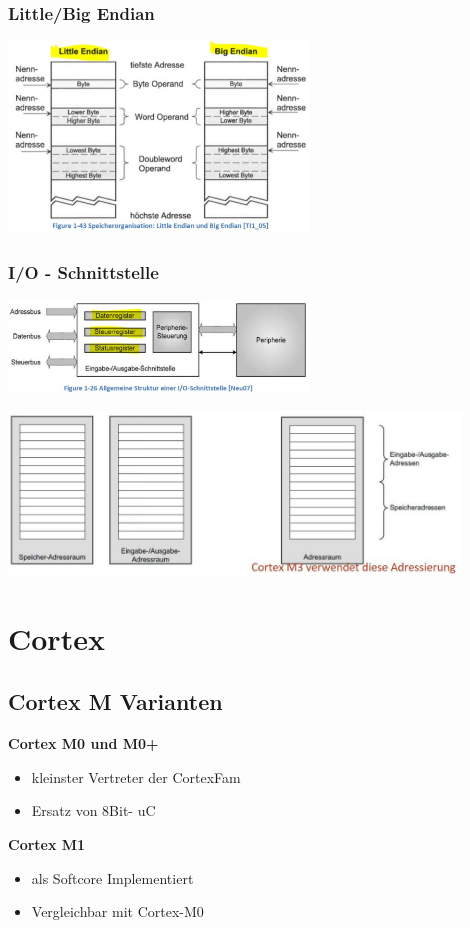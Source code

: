 \begin{multicols}{2}
    \subsubsection{Little/Big Endian}
    \includegraphics[width=8cm]{images/LittleBigEndian}
    
    \subsubsection{I/O - Schnittstelle}
    \includegraphics[width=8cm]{images/IOSchnittstelle}
\end{multicols}

\includegraphics[width=12cm]{images/Speicherraumadressierung}
\clearpage

\section{Cortex}
\subsection{Cortex M Varianten}
\begin{multicols}{2}
    \textbf{Cortex M0 und M0+}
    \begin{itemize}
        \item kleinster Vertreter der CortexFam
        \item Ersatz von 8Bit- uC
    \end{itemize}                     
    \textbf{Cortex M1}
    \begin{itemize}
        \item als Softcore Implementiert
        \item Vergleichbar mit Cortex-M0
    \end{itemize}
\end{multicols}

